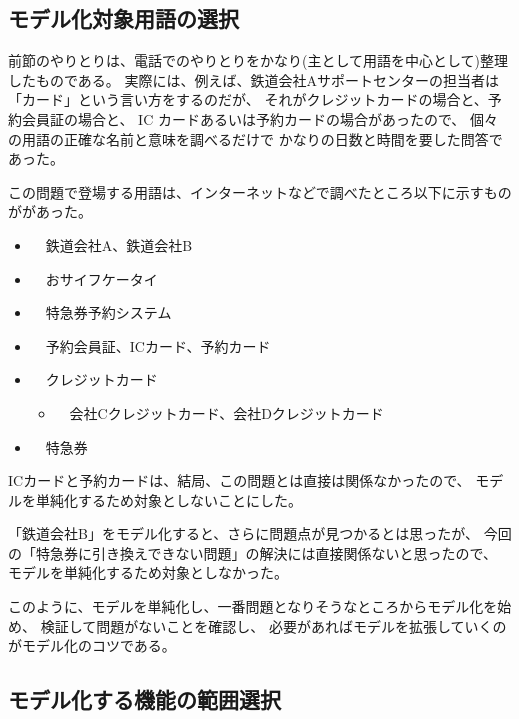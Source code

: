 \subsection {モデル化対象用語の選択}


前節のやりとりは、電話でのやりとりをかなり(主として用語を中心として)整理したものである。
実際には、例えば、鉄道会社Aサポートセンターの担当者は「カード」という言い方をするのだが、
それがクレジットカードの場合と、予約会員証の場合と、
IC カードあるいは予約カードの場合があったので、
個々の用語の正確な名前と意味を調べるだけで
かなりの日数と時間を要した問答であった。

この問題で登場する用語は、インターネットなどで調べたところ以下に示すものががあった。

\begin{itemize}
\item　鉄道会社A、鉄道会社B
\item　おサイフケータイ
\item　特急券予約システム
\item　予約会員証、ICカード、予約カード
\item　クレジットカード
	\begin{itemize}
	\item　会社Cクレジットカード、会社Dクレジットカード
	\end{itemize} 
\item　特急券
\end{itemize} 

ICカードと予約カードは、結局、この問題とは直接は関係なかったので、
モデルを単純化するため対象としないことにした。

「鉄道会社B」をモデル化すると、さらに問題点が見つかるとは思ったが、
今回の「特急券に引き換えできない問題」の解決には直接関係ないと思ったので、
モデルを単純化するため対象としなかった。

このように、モデルを単純化し、一番問題となりそうなところからモデル化を始め、
検証して問題がないことを確認し、
必要があればモデルを拡張していくのがモデル化のコツである。

\subsection {モデル化する機能の範囲選択}



